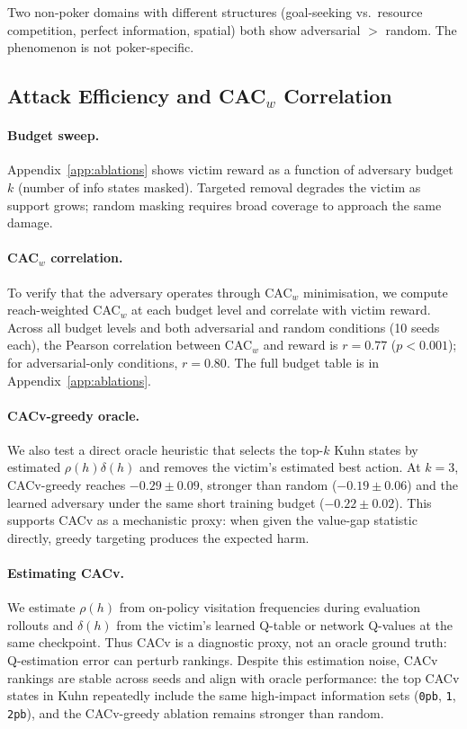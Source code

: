 \documentclass{article}
\begin{document}
Two non-poker domains with different structures (goal-seeking vs.\ resource competition, perfect information, spatial) both show adversarial $>$ random. The phenomenon is not poker-specific.

\subsection{Attack Efficiency and CAC$_w$ Correlation}
\label{sec:efficiency}

\paragraph{Budget sweep.}
Appendix~\ref{app:ablations} shows victim reward as a function of adversary budget $k$ (number of info states masked). Targeted removal degrades the victim as support grows; random masking requires broad coverage to approach the same damage.

\paragraph{CAC$_w$ correlation.}
To verify that the adversary operates through CAC$_w$ minimisation, we compute reach-weighted CAC$_w$ at each budget level and correlate with victim reward. Across all budget levels and both adversarial and random conditions (10 seeds each), the Pearson correlation between CAC$_w$ and reward is $r = 0.77$ ($p < 0.001$); for adversarial-only conditions, $r = 0.80$. The full budget table is in Appendix~\ref{app:ablations}.

\paragraph{CACv-greedy oracle.}
We also test a direct oracle heuristic that selects the top-$k$ Kuhn states by estimated $\rho(h)\delta(h)$ and removes the victim's estimated best action. At $k=3$, CACv-greedy reaches $-0.29 \pm 0.09$, stronger than random ($-0.19 \pm 0.06$) and the learned adversary under the same short training budget ($-0.22 \pm 0.02$). This supports CACv as a mechanistic proxy: when given the value-gap statistic directly, greedy targeting produces the expected harm.

\paragraph{Estimating CACv.}
We estimate $\rho(h)$ from on-policy visitation frequencies during evaluation rollouts and $\delta(h)$ from the victim's learned Q-table or network Q-values at the same checkpoint. Thus CACv is a diagnostic proxy, not an oracle ground truth: Q-estimation error can perturb rankings. Despite this estimation noise, CACv rankings are stable across seeds and align with oracle performance: the top CACv states in Kuhn repeatedly include the same high-impact information sets (\texttt{0pb}, \texttt{1}, \texttt{2pb}), and the CACv-greedy ablation remains stronger than random.
\end{document}
